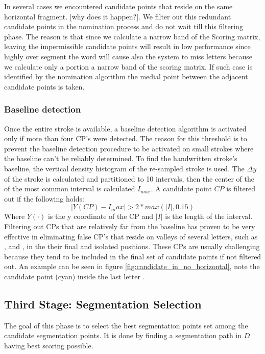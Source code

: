 \documentclass[journal,compsoc]{IEEEtran}
\begin{document}
In several cases we encountered candidate points that reside on the same horizontal fragment. [why does it happen?]. We filter out this redundant candidate points in the nomination process and do not wait till this filtering phase. The reason is that since we calculate a narrow band of the Scoring matrix, leaving the impermissible candidate points will result in low performance since highly over segment the word will cause also the system to miss letters because we calculate only a portion a narrow band of the scoring matrix. If such case is identified by the nomination algorithm the medial point between the adjacent candidate points is taken.

\subsubsection{Baseline detection}
Once the entire stroke is available, a baseline detection algorithm is activated only if more than four CP's were detected. The reason for this threshold is to prevent the baseline detection procedure to be activated on small strokes where the baseline can't be reliably determined. To find the handwritten stroke's baseline, the vertical density histogram of the re-sampled stroke is used. The $\Delta y$ of the stroke is calculated and partitioned to 10 intervals, then the center of the of the most common interval is calculated $I_{max}$. A candidate point $CP$ is filtered out if the following holds:
\begin{equation}
|Y(CP)-I_max|>2*max(|I|,0.15) 
\end{equation}
Where $Y(\cdot)$ is the y coordinate of the CP and $|I|$ is the length of the interval. 
Filtering out CPs that are relatively far from the baseline has proven to be very effective in eliminating false CP's that reside on valleys of several letters, such as ,  and , in the their final and isolated positions. These CPs are usually challenging because they tend to be included in the final set of candidate points if not filtered out. An example can be seen in figure \ref{fig:candidate_in_no_horizontal}, note the candidate point (cyan) inside the last letter . 

\subsection{Third  Stage: Segmentation Selection}
The goal of this phase is to select the best segmentation points set among the candidate segmentation points. It is done by finding a segmentation path in $D$ having best scoring possible. 
 
\end{document}
